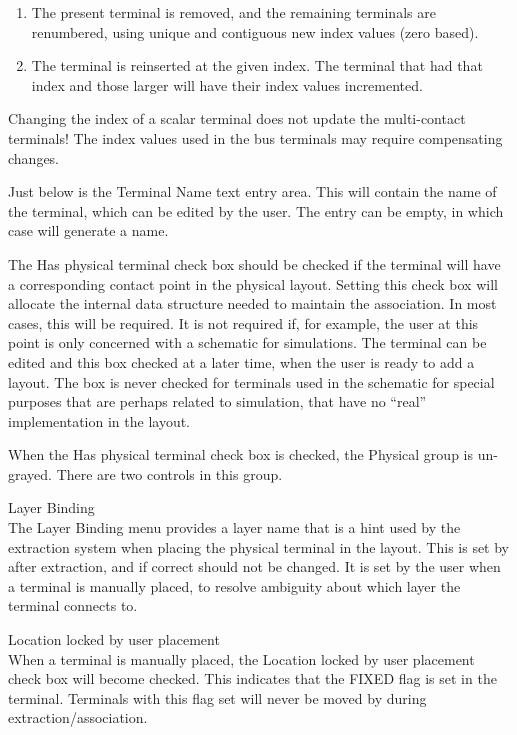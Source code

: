 \begin{enumerate}
\item{The present terminal is removed, and the remaining terminals are
renumbered, using unique and contiguous new index values (zero based).}

\item{The terminal is reinserted at the given index.  The terminal
that had that index and those larger will have their index values
incremented.}
\end{enumerate}

Changing the index of a scalar terminal does {\cb not} update the
multi-contact terminals!  The index values used in the bus terminals
may require compensating changes.

Just below is the {\cb Terminal Name} text entry area.  This will
contain the name of the terminal, which can be edited by the user. 
The entry can be empty, in which case {\Xic} will generate a name.

The {\cb Has physical terminal} check box should be checked if the
terminal will have a corresponding contact point in the physical
layout.  Setting this check box will allocate the internal data
structure needed to maintain the association.  In most cases, this
will be required.  It is not required if, for example, the user at
this point is only concerned with a schematic for simulations.  The
terminal can be edited and this box checked at a later time, when the
user is ready to add a layout.  The box is never checked for terminals
used in the schematic for special purposes that are perhaps related to
simulation, that have no ``real'' implementation in the layout.

When the {\cb Has physical terminal} check box is checked, the {\cb
Physical} group is un-grayed.  There are two controls in this group. 

\begin{description}
\item{\cb Layer Binding}\\
The {\cb Layer Binding} menu provides a layer name that is a hint used
by the extraction system when placing the physical terminal in the
layout.  This is set by {\Xic} after extraction, and if correct should
not be changed.  It is set by the user when a terminal is manually
placed, to resolve ambiguity about which layer the terminal connects
to.

\item{\cb Location locked by user placement}\\
When a terminal is manually placed, the {\cb Location locked by user
placement} check box will become checked.  This indicates that the
{\et FIXED} flag is set in the terminal.  Terminals with this flag set
will never be moved by {\Xic} during extraction/association. 
\end{description}

